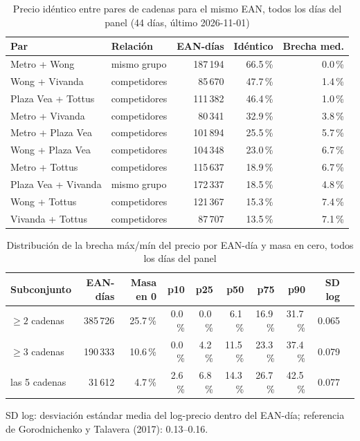 
\begin{table}[htbp]
\caption{Precio id\'entico entre pares de cadenas para el mismo EAN, todos los d\'ias del panel (44 d\'ias, \'ultimo 2026-11-01)}
\label{tab:identidad}
\centering\scriptsize\setlength{\tabcolsep}{3pt}
\begin{tabular}{@{}llrrr@{}}
\toprule
Par & Relaci\'on & EAN-d\'ias & Id\'entico & Brecha med. \\
\midrule
Metro + Wong & mismo grupo & 187\,194 & 66.5\,\% & 0.0\,\% \\
Wong + Vivanda & competidores & 85\,670 & 47.7\,\% & 1.4\,\% \\
Plaza Vea + Tottus & competidores & 111\,382 & 46.4\,\% & 1.0\,\% \\
Metro + Vivanda & competidores & 80\,341 & 32.9\,\% & 3.8\,\% \\
Metro + Plaza Vea & competidores & 101\,894 & 25.5\,\% & 5.7\,\% \\
Wong + Plaza Vea & competidores & 104\,348 & 23.0\,\% & 6.7\,\% \\
Metro + Tottus & competidores & 115\,637 & 18.9\,\% & 6.7\,\% \\
Plaza Vea + Vivanda & mismo grupo & 172\,337 & 18.5\,\% & 4.8\,\% \\
Wong + Tottus & competidores & 121\,367 & 15.3\,\% & 7.4\,\% \\
Vivanda + Tottus & competidores & 87\,707 & 13.5\,\% & 7.1\,\% \\
\bottomrule\end{tabular}\end{table}

\begin{table}[t]
\caption{Distribuci\'on de la brecha m\'ax/m\'in del precio por EAN-d\'ia y masa en cero, todos los d\'ias del panel}
\label{tab:brecha}
\centering\scriptsize\setlength{\tabcolsep}{4pt}
\begin{tabular}{@{}lrrrrrrrrr@{}}
\toprule
Subconjunto & EAN-d\'ias & Masa en 0 & p10 & p25 & p50 & p75 & p90 & SD log \\
\midrule
$\geq 2$ cadenas & 385\,726 & 25.7\,\% & 0.0\,\% & 0.0\,\% & 6.1\,\% & 16.9\,\% & 31.7\,\% & 0.065 \\
$\geq 3$ cadenas & 190\,333 & 10.6\,\% & 0.0\,\% & 4.2\,\% & 11.5\,\% & 23.3\,\% & 37.4\,\% & 0.079 \\
las 5 cadenas & 31\,612 & 4.7\,\% & 2.6\,\% & 6.8\,\% & 14.3\,\% & 26.7\,\% & 42.5\,\% & 0.077 \\
\bottomrule\end{tabular}
\par\smallskip\raggedright\scriptsize SD log: desviaci\'on est\'andar media del log-precio dentro del EAN-d\'ia; referencia de Gorodnichenko y Talavera (2017): 0.13--0.16.
\end{table}

